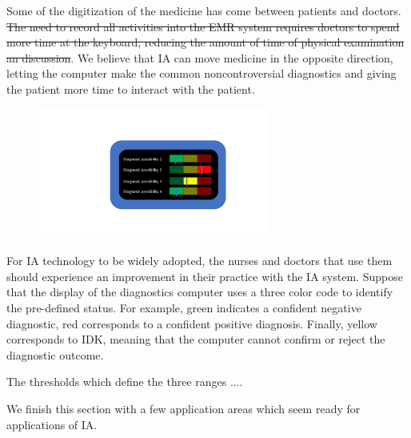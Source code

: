 \documentclass[11pt]{pnas-new}
\begin{document}
  Some of the digitization of the medicine has come between patients
  and doctors.  \sout{The need to record all activities into the EMR system requires
  doctors to spend more time at the keyboard, reducing the amount of
  time of physical examination an discussion}.  We believe that IA can
  move medicine in the opposite direction, letting the computer make
  the common noncontroversial diagnostics and giving the patient more
  time to interact with the patient.

\begin{figure}[h]
\begin{center}
\includegraphics[width=3in]{figures/RedYellowGreen.pdf}
\end{center}
\end{figure}

  For IA technology to be widely adopted, the nurses and doctors that
  use them should experience an improvement in their practice {\color{blue}with the IA system}. Suppose
  that the display of the diagnostics computer uses a three color code
  to identify {\color{blue}the pre-defined status. For example,} green indicates a confident
  negative diagnostic, red corresponds to a confident positive
  diagnosis. Finally, yellow corresponds to IDK, meaning that the
  computer cannot confirm or reject the diagnostic outcome.

  The thresholds which define the three ranges .... 


  
  We finish this section with a few application areas which seem ready
  for applications of IA.
  
\end{document}
